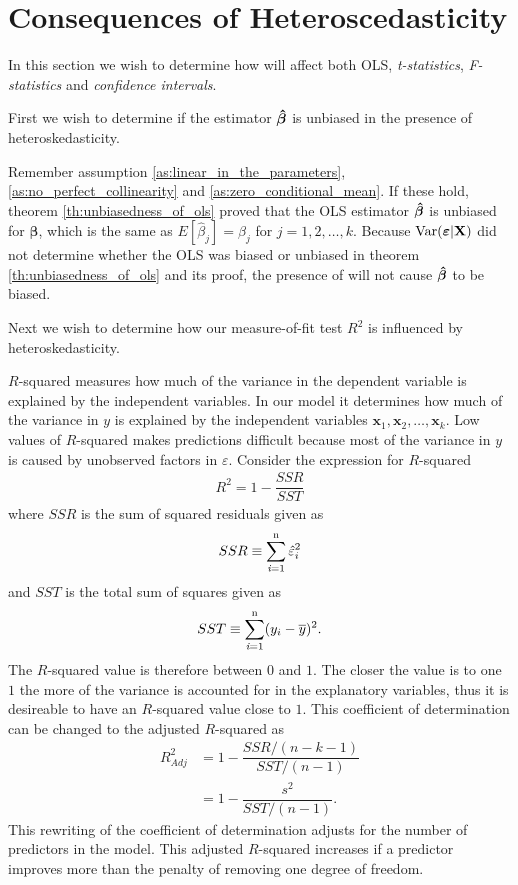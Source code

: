 \newpage
\section{Consequences of Heteroscedasticity}\label{sec:consequence_of_hetero}
In this section we wish to determine how \hetero will affect both OLS, \textit{t-statistics}, \textit{F-statistics} and \textit{confidence intervals}. 

First we wish to determine if the estimator $\operatorname{\boldsymbol{\hat{\beta}}}$ is unbiased in the presence of heteroskedasticity.  

Remember assumption \ref{as:linear_in_the_parameters}, \ref{as:no_perfect_collinearity} and \ref{as:zero_conditional_mean}. If these hold, theorem \ref{th:unbiasedness_of_ols} proved that the OLS estimator $\operatorname{\boldsymbol{\hat{\beta}}}$ is unbiased for $\boldsymbol{\beta}$, which is the same as $E[\hat{\beta}_j] = \beta_j
$ for $j = 1,2, \ldots, k$. 
Because $\operatorname{\text{Var}}(\boldsymbol{\varepsilon} | \mathbf{X})$ did not determine whether the OLS was biased or unbiased in theorem \ref{th:unbiasedness_of_ols} and its proof, the presence of \hetero will not cause $\operatorname{\boldsymbol{\hat{\beta}}}$ to be biased. 

Next we wish to determine how our measure-of-fit test $R^2$ is influenced by heteroskedasticity.

$R$-squared measures how much of the variance in the dependent variable is explained by the independent variables. In our model it determines how much of the variance in $y$ is explained by the independent variables $\mathbf{x}_1, \mathbf{x}_2, \ldots, \mathbf{x}_k$. 
Low values of $R$-squared makes predictions difficult because most of the variance in $y$ is caused by unobserved factors in $\varepsilon$.
Consider the expression for $R$-squared
\begin{align*}
    R^2 = 1 - \dfrac{SSR}{SST}
\end{align*}
where $SSR$ is the sum of squared residuals given as
\begin{align*}
    SSR \equiv \operatorname{\sum_{\textit{i}=1}^n} \hat{\varepsilon}_i^2
\end{align*}
and $SST$ is the total sum of squares given as
\begin{align*}
    SST \equiv \operatorname{\sum_{\textit{i}=1}^n} (y_i - \overline{y})^2. 
\end{align*}
The $R$-squared value is therefore between $0$ and $1$. The closer the value is to one $1$ the more of the variance is accounted for in the explanatory variables, thus it is desireable to have an $R$-squared value close to $1$.
This coefficient of determination can be changed to the adjusted $R$-squared as
\begin{align*}
    R^2_{Adj} &= 1 - \dfrac{SSR/(n - k - 1)}{SST/(n - 1)}\\
      &= 1 - \dfrac{s^2}{SST/(n-1)}.
\end{align*}
This rewriting of the coefficient of determination adjusts for the number of predictors in the model. This adjusted $R$-squared increases if a predictor improves more than the penalty of removing one degree of freedom. 

